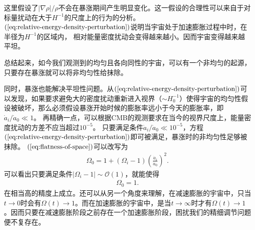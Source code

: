 这里假设了$|\nabla\rho|/\rho$不会在暴涨期间产生明显变化。这一假设的合理性可以来自于对标量扰动在大于$H^{-1}$的尺度上的行为的分析。
$(\ref{eq:relative-energy-density-perturbation})$说明当宇宙处于加速膨胀过程中时，在半径为$H^{-1}$的区域内，
相对能量密度扰动会变得越来越小。因而宇宙变得越来越平坦。

总结起来，如今我们观测到的均匀且各向同性的宇宙，可以有一个非均匀的起源，只要存在暴涨就可以将非均匀性给抹除。

同时，暴涨也能解决平坦性问题。从$(\ref{eq:relative-energy-density-perturbation})$可以发现，如果要求避免大的密度扰动重新进入视界（$\sim
H_0^{-1}$）使得宇宙的均匀性假设被破坏，那么必须假设暴涨开始时候的膨胀率远小于今天的膨胀率，即$\dot{a}_{i}/\dot{a}_0\ll
1$。
再精确一点，可以根据CMB的观测要求在当今的视界尺度上，能量密度扰动的方差不应当超过$10^{-5}$。
只要满足条件$\dot{a}_{i}/\dot{a}_0\ll
10^{-5}$，方程$(\ref{eq:relative-energy-density-perturbation})$即可被满足，暴涨时的非均匀性足够被抹除。
$(\ref{eq:flatness-of-space})$可以改写为
\begin{align}
  \Omega_0=1+{\left(\Omega_{i}-1\right)}{\left(\frac{\dot{a}_{i}}{\dot{a}_0}\right)}^2.
\end{align}
可以看出只要满足条件$|\Omega_{i}-1|\sim\mathcal{O}(1)$，就能使得
\begin{align}
  \Omega_0=1.
\end{align}
在相当高的精度上成立。还可以从另一个角度来理解，在减速膨胀的宇宙中，只当$t\rightarrow
0$时会有$\Omega(t)\rightarrow
1$。而在加速膨胀的宇宙中，是当$t\rightarrow\infty$时才有$\Omega(t)\rightarrow
1$。因而只要在减速膨胀阶段之前存在一个加速膨胀阶段，困扰我们的精细调节问题便不复存在。



